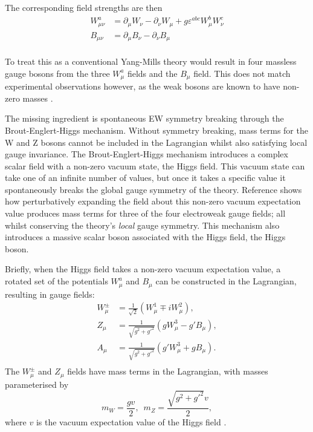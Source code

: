 The corresponding field strengths are then
\begin{equation*}
  \begin{split}
  W^a_{\mu\nu} &= \partial_\mu W_\nu - \partial_\nu W_\mu
               + g \varepsilon^{abc}W^b_\mu W^c_\nu \\
  B_{\mu\nu}   &= \partial_\mu B_\nu - \partial_\nu B_\mu \\
  \end{split}
\end{equation*}

To treat this as a conventional Yang-Mills theory would result in four massless
gauge bosons from the three $W^a_\mu$ fields and the $B_\mu$ field.
This does not match experimental observations however, as the weak bosons are
known to have non-zero masses \cite{UA2discoveryW,UA1discoveryZ}.

The missing ingredient is  spontaneous \ac{EW} symmetry breaking through the
Brout-Englert-Higgs mechanism\cite{Englert1964,Higgs1964}.
%
Without symmetry breaking, mass terms for the W and Z bosons cannot be included
in the Lagrangian whilst also satisfying local gauge invariance. The
Brout-Englert-Higgs mechanism introduces a complex scalar field with a non-zero
vacuum state, the Higgs field. This vacuum state can take one of an infinite
number of values, but once it takes a specific value it spontaneously breaks the
global gauge symmetry of the theory. Reference \cite{Thomson2013} shows how
perturbatively expanding the field about this non-zero vacuum expectation value
produces mass terms for three of the four electroweak gauge fields; all whilst
conserving the theory's \emph{local} gauge symmetry.  This mechanism also
introduces a massive scalar boson associated with the Higgs field, the Higgs
boson.

%
Briefly, when the Higgs field
takes a non-zero vacuum expectation value, a rotated set of the potentials
$W^a_\mu$ and $B_\mu$ can be constructed in the Lagrangian, resulting
in gauge fields:
\begin{equation*}
  \begin{split}
    W_\mu^\pm &= \frac1{\sqrt2} (W_\mu^1 \mp iW_\mu^2), \\
    Z_\mu     &= \frac1{\sqrt{g^2 + g'^2}}( gW_\mu^3 - g' B_\mu ), \\
    A_\mu     &= \frac1{\sqrt{g^2 + g'^2}}( g'W_\mu^3 + g B_\mu ). \\
  \end{split}
\end{equation*}
%
The $W^\pm_\mu$ and $Z_\mu$ fields have mass terms in the Lagrangian, with
masses parameterised by
\begin{equation*}
  m_W = \frac{gv}2, \,\,\, m_Z = \frac{\sqrt{g^2 + g'^2}v}2,
\end{equation*}
where $v$ is the vacuum expectation value of the Higgs field \cite{Peskin1995}.

